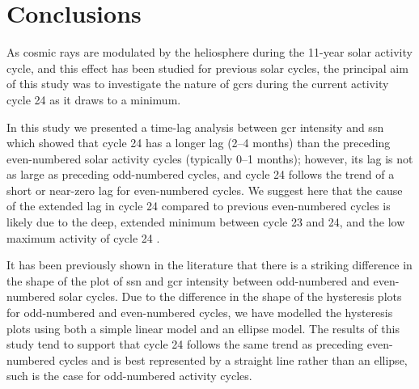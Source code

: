 \section{Conclusions}

As cosmic rays are modulated by the heliosphere during the 11-year solar activity cycle, and this effect has been studied for previous solar cycles, the principal aim of this study was to investigate the nature of \glspl{gcr} during the current activity cycle 24 as it draws to a minimum.

In this study we presented a time-lag analysis between \gls{gcr} intensity and \gls{ssn} which showed that cycle 24 has a longer lag (2--4 months) than the preceding even-numbered solar activity cycles (typically 0--1 months); however, its lag is not as large as preceding odd-numbered cycles, and cycle 24 follows the trend of a short or near-zero lag for even-numbered cycles. We suggest here that the cause of the extended lag in cycle 24 compared to previous even-numbered cycles is likely due to the deep, extended minimum between cycle 23 and 24, and the low maximum activity of cycle 24 \citep{broomhall_helioseismic_2017}.



It has been previously shown in the literature that there is a striking difference in the shape of the plot of \gls{ssn} and \gls{gcr} intensity between odd-numbered and even-numbered solar cycles. Due to the difference in the shape of the hysteresis plots for odd-numbered and even-numbered cycles, we have modelled the hysteresis plots using both a simple linear model and an ellipse model. The results of this study tend to support that cycle 24 follows the same trend as preceding even-numbered cycles and is best represented by a straight line rather than an ellipse, such is the case for odd-numbered activity cycles.

